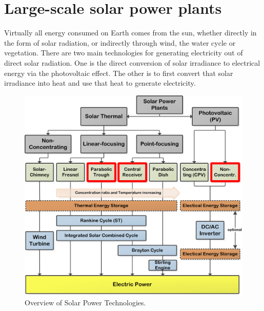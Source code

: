 \chapter{Large-scale solar power plants}
Virtually all energy consumed on Earth comes from the sun, whether directly in the form of solar radiation, or indirectly through wind, the water cycle or vegetation. There are two main technologies for generating electricity out of direct solar radiation. One is the direct conversion of solar irradiance to electrical energy via the photovoltaic effect. The other is to first convert that solar irradiance into heat and use that heat to generate electricity. 


\begin{figure}[!h] 
\centering
\includegraphics[width=0.8\linewidth]{FIG/OverviewSTP}
\caption[Overview of Solar Power Technologies.]{Overview of Solar Power Technologies.}\label{OverviewSTP}
\end{figure}



